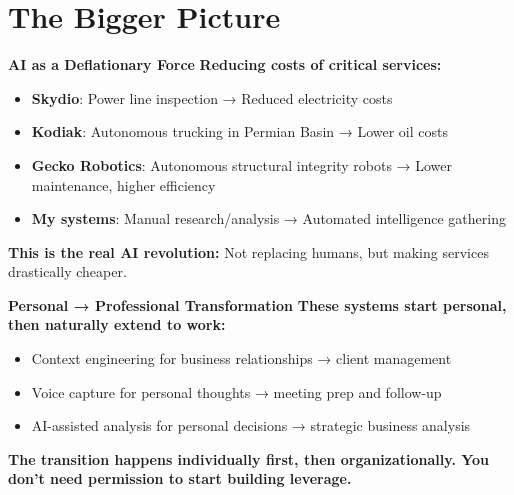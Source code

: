 \documentclass[
  ignorenonframetext,
  aspectratio=169,
]{beamer}
\providecommand{\tightlist}{%
  \setlength{\itemsep}{0pt}\setlength{\parskip}{0pt}}
\begin{document}
\section{\texorpdfstring{\textbf{The Bigger
Picture}}{The Bigger Picture}}\label{the-bigger-picture}

\begin{frame}{\textbf{AI as a Deflationary Force}}
\label{ai-as-a-deflationary-force}
\textbf{Reducing costs of critical services:}

\begin{itemize}
\tightlist
\item
  \textbf{Skydio}: Power line inspection → Reduced electricity costs
\item
  \textbf{Kodiak}: Autonomous trucking in Permian Basin → Lower oil
  costs
\item
  \textbf{Gecko Robotics}: Autonomous structural integrity robots →
  Lower maintenance, higher efficiency
\item
  \textbf{My systems}: Manual research/analysis → Automated intelligence
  gathering
\end{itemize}

\textbf{This is the real AI revolution:} Not replacing humans, but
making services drastically cheaper.
\end{frame}

\begin{frame}{\textbf{Personal → Professional Transformation}}
\label{personal-professional-transformation}
\textbf{These systems start personal, then naturally extend to work:}

\begin{itemize}
\tightlist
\item
  Context engineering for business relationships → client management
\item
  Voice capture for personal thoughts → meeting prep and follow-up
\item
  AI-assisted analysis for personal decisions → strategic business
  analysis
\end{itemize}

\textbf{The transition happens individually first, then
organizationally. You don't need permission to start building leverage.}
\end{frame}
\end{document}

